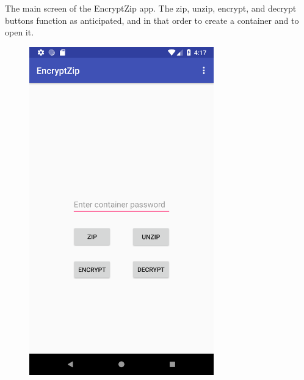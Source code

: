 \documentclass[10pt,a4paper]{article}
\begin{document}
The main screen of the EncryptZip app. The zip, unzip, encrypt, and decrypt buttons function as anticipated, and in that order to create a container and to open it.
\begin{figure}[H]
\includegraphics[width=8cm]{main1}
\end{figure}

\clearpage
\end{document}
